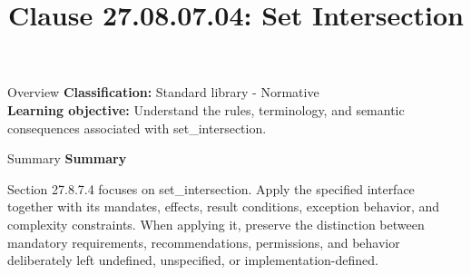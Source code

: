 \documentclass[10pt,letterpaper]{article}
\title{Clause 27.08.07.04: Set Intersection}
\author{}
\date{}
\begin{document}
\maketitle
\begin{CornellOverviewBox}{Overview}
\textbf{Classification:} Standard library - Normative\\[2pt]
\textbf{Learning objective:} Understand the rules, terminology, and semantic consequences associated with set\_intersection.
\end{CornellOverviewBox}\begin{CornellSummaryBox}{Summary}
{\sffamily\bfseries\color{Accent} Summary}\par\vspace{3pt}Section 27.8.7.4 focuses on set\_intersection. Apply the specified interface together with its mandates, effects, result conditions, exception behavior, and complexity constraints. When applying it, preserve the distinction between mandatory requirements, recommendations, permissions, and behavior deliberately left undefined, unspecified, or implementation-defined.
\end{CornellSummaryBox}
\end{document}
